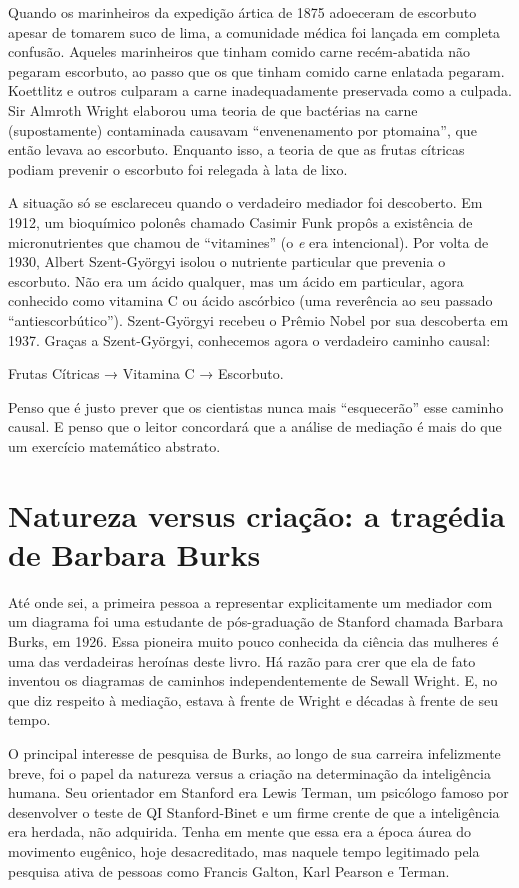 \documentclass[11pt,a5paper,twoside]{book}
\begin{document}
Quando os marinheiros da expedição ártica de 1875 adoeceram de escorbuto apesar de tomarem suco de lima, a comunidade médica foi lançada em completa confusão. Aqueles marinheiros que tinham comido carne recém-abatida não pegaram escorbuto, ao passo que os que tinham comido carne enlatada pegaram. Koettlitz e outros culparam a carne inadequadamente preservada como a culpada. Sir Almroth Wright elaborou uma teoria de que bactérias na carne (supostamente) contaminada causavam “envenenamento por ptomaina”, que então levava ao escorbuto. Enquanto isso, a teoria de que as frutas cítricas podiam prevenir o escorbuto foi relegada à lata de lixo.

A situação só se esclareceu quando o verdadeiro mediador foi descoberto. Em 1912, um bioquímico polonês chamado Casimir Funk propôs a existência de micronutrientes que chamou de “vitamines” (o \textit{e} era intencional). Por volta de 1930, Albert Szent-Györgyi isolou o nutriente particular que prevenia o escorbuto. Não era um ácido qualquer, mas um ácido em particular, agora conhecido como vitamina C ou ácido ascórbico (uma reverência ao seu passado “antiescorbútico”). Szent-Györgyi recebeu o Prêmio Nobel por sua descoberta em 1937. Graças a Szent-Györgyi, conhecemos agora o verdadeiro caminho causal:

Frutas Cítricas → Vitamina C → Escorbuto.

Penso que é justo prever que os cientistas nunca mais “esquecerão” esse caminho causal. E penso que o leitor concordará que a análise de mediação é mais do que um exercício matemático abstrato.

\section{Natureza versus criação: a tragédia de Barbara Burks}
Até onde sei, a primeira pessoa a representar explicitamente um mediador com um diagrama foi uma estudante de pós-graduação de Stanford chamada Barbara Burks, em 1926. Essa pioneira muito pouco conhecida da ciência das mulheres é uma das verdadeiras heroínas deste livro. Há razão para crer que ela de fato inventou os diagramas de caminhos independentemente de Sewall Wright. E, no que diz respeito à mediação, estava à frente de Wright e décadas à frente de seu tempo.

O principal interesse de pesquisa de Burks, ao longo de sua carreira infelizmente breve, foi o papel da natureza versus a criação na determinação da inteligência humana. Seu orientador em Stanford era Lewis Terman, um psicólogo famoso por desenvolver o teste de QI Stanford-Binet e um firme crente de que a inteligência era herdada, não adquirida. Tenha em mente que essa era a época áurea do movimento eugênico, hoje desacreditado, mas naquele tempo legitimado pela pesquisa ativa de pessoas como Francis Galton, Karl Pearson e Terman.
\end{document}
